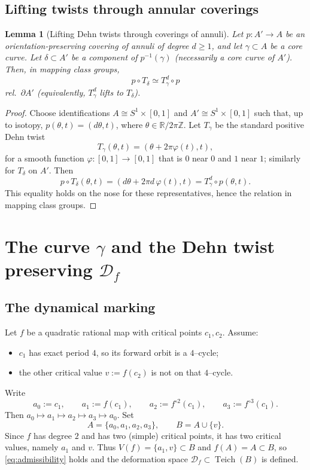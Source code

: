 \documentclass[11pt]{article}
\newtheorem{lemma}[theorem]{Lemma}
\DeclareMathOperator{\Teich}{Teich}
\begin{document}
\subsection{Lifting twists through annular coverings}
\begin{lemma}[Lifting Dehn twists through coverings of annuli]\label{lem:lift-twist-annulus}
Let $p:A'\to A$ be an orientation-preserving covering of annuli of degree $d\ge 1$, and let $\gamma\subset A$ be a core curve. Let $\delta\subset A'$ be a component of $p^{-1}(\gamma)$ (necessarily a core curve of $A'$). Then, in mapping class groups,
\[
p\circ T_\delta \simeq T_\gamma^{d}\circ p
\]
rel.\ $\partial A'$ (equivalently, $T_\gamma^{d}$ lifts to $T_\delta$).
\end{lemma}

\begin{proof}
Choose identifications $A\cong S^1\times[0,1]$ and $A'\cong S^1\times[0,1]$ such that, up to isotopy, $p(\theta,t)=(d\theta,t)$, where $\theta\in \mathbb R/2\pi\mathbb Z$. Let $T_\gamma$ be the standard positive Dehn twist
\[
T_\gamma(\theta,t)=(\theta+2\pi \varphi(t),t),
\]
for a smooth function $\varphi:[0,1]\to[0,1]$ that is $0$ near $0$ and $1$ near $1$; similarly for $T_\delta$ on $A'$. Then
\[
p\circ T_\delta(\theta,t)=(d\theta+2\pi d\,\varphi(t),t)=T_\gamma^{d}\circ p(\theta,t).
\]
This equality holds on the nose for these representatives, hence the relation in mapping class groups.
\end{proof}

\section{The curve $\gamma$ and the Dehn twist preserving $\mathcal D_f$}

\subsection{The dynamical marking}
Let $f$ be a quadratic rational map with critical points $c_1,c_2$. Assume:
\begin{itemize}
\item $c_1$ has exact period $4$, so its forward orbit is a $4$--cycle;
\item the other critical value $v:=f(c_2)$ is not on that $4$--cycle.
\end{itemize}
Write
\[
a_0:=c_1,\qquad a_1:=f(c_1),\qquad a_2:=f^{\circ 2}(c_1),\qquad a_3:=f^{\circ 3}(c_1).
\]
Then $a_0\mapsto a_1\mapsto a_2\mapsto a_3\mapsto a_0$. Set
\[
A=\{a_0,a_1,a_2,a_3\},\qquad B=A\cup\{v\}.
\]
Since $f$ has degree $2$ and has two (simple) critical points, it has two critical values, namely $a_1$ and $v$. Thus $V(f)=\{a_1,v\}\subset B$ and $f(A)=A\subset B$, so \eqref{eq:admissibility} holds and the deformation space $\mathcal D_f\subset \Teich(B)$ is defined.
\end{document}
